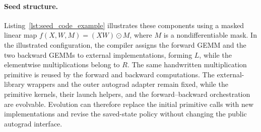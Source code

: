 \paragraph{Seed structure.}
Listing~\ref{lst:seed_code_example} illustrates these components using a masked linear map $f(X,W,M)=(XW)\odot M$, where $M$ is a nondifferentiable mask. In the illustrated configuration, the compiler assigns the forward GEMM and the two backward GEMMs to external implementations, forming $L$, while the elementwise multiplications belong to $R$. The same handwritten multiplication primitive is reused by the forward and backward computations. The external-library wrappers and the outer autograd adapter remain fixed, while the primitive kernels, their launch helpers, and the forward--backward orchestration are evolvable. Evolution can therefore replace the initial primitive calls with new implementations and revise the saved-state policy without changing the public autograd interface.


